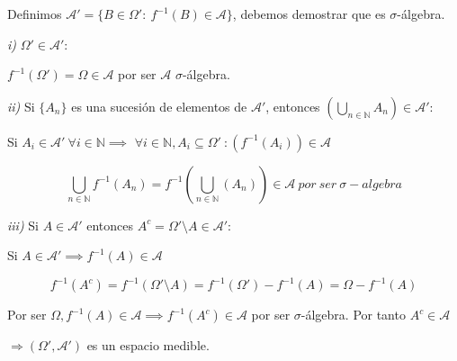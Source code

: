 
Definimos $\mathcal{A}'=\{ B\in\Omega ':\ f^{-1}(B)\in \mathcal{A} \}$, debemos demostrar que es $\sigma$-álgebra.

\textit{i)}
$\Omega ' \in \mathcal{A}'$:

$f^{-1}(\Omega ') = \Omega\in\mathcal{A}$ por ser $\mathcal{A}$ $\sigma$-álgebra.

\textit{ii)}
Si $\{A_n\}$ es una sucesión de elementos de $\mathcal{A}'$, entonces $\left( \bigcup_{n\in\mathbb{N}}A_n \right) \in \mathcal{A}'$:

Si $A_i\in \mathcal{A}' \ \forall       
 i\in\mathbb{N} \implies$
$\forall i\in\mathbb{N}, A_i\subseteq\Omega '\ : \left( f^{-1}(A_i)\right) \in \mathcal{A}$

\[ \bigcup_{n \in \mathbb{N} }f^{-1}(A_n) 
= f^{-1}\left( \bigcup_{n \in \mathbb{N} }(A_n) \right)
\in \mathcal{A} \ por \ ser \ \sigma -algebra\] 

\textit{iii)}
Si $A\in\mathcal{A}'$ entonces $A^c=\Omega '\setminus A \in \mathcal{A}'$:

Si $A\in \mathcal{A}' \implies f^{-1}(A)\in \mathcal{A}$

\[f^{-1}(A^c) = f^{-1}(\Omega'\setminus A) = f^{-1}(\Omega') - f^{-1}(A) = \Omega - f^{-1}(A) \]

Por ser $\Omega , f^{-1}(A)\in \mathcal{A} \implies f^{-1}(A^c)\in \mathcal{A}$ por ser $\sigma$-álgebra. Por tanto $A^c\in \mathcal{A}$

$\Longrightarrow (\Omega', \mathcal{A}')$ es un espacio medible. 